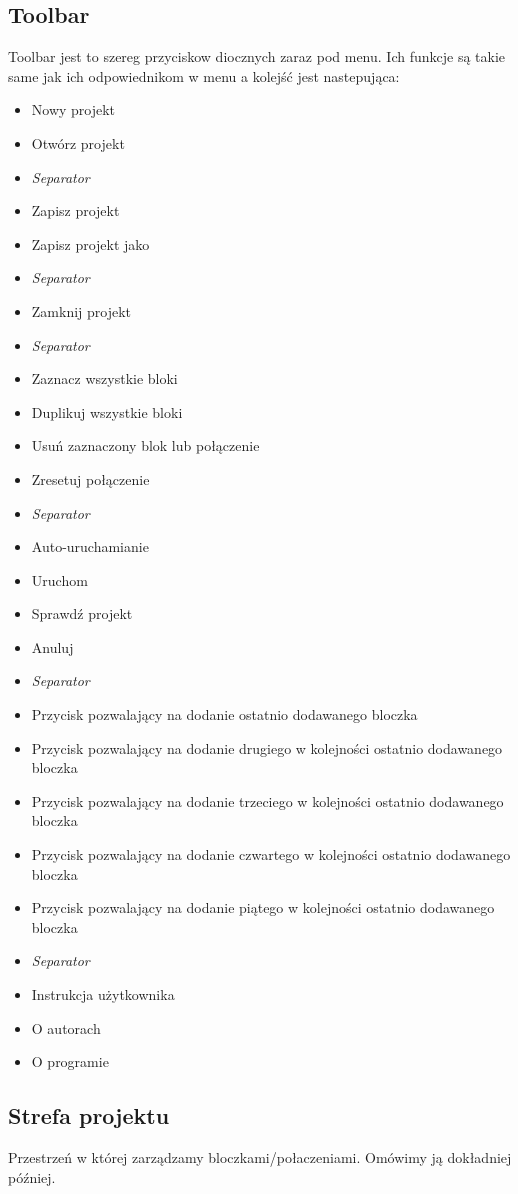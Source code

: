 \documentclass[a4paper,10pt]{article}
\begin{document}
\subsection{Toolbar}
Toolbar jest to szereg przyciskow diocznych zaraz pod menu. Ich funkcje są takie same jak ich odpowiednikom w menu a kolejść jest nastepująca:
\begin{itemize}
 \item Nowy projekt
 \item Otwórz projekt
 \item \textit{Separator}
 \item Zapisz projekt
 \item Zapisz projekt jako
 \item \textit{Separator}
 \item Zamknij projekt
 \item \textit{Separator}
 \item Zaznacz wszystkie bloki
 \item Duplikuj wszystkie bloki
 \item Usuń zaznaczony blok lub połączenie
 \item Zresetuj połączenie
 \item \textit{Separator}
 \item Auto-uruchamianie
 \item Uruchom
 \item Sprawdź projekt
 \item Anuluj
 \item \textit{Separator}
 \item Przycisk pozwalający na dodanie ostatnio dodawanego bloczka
 \item Przycisk pozwalający na dodanie drugiego w kolejności ostatnio dodawanego bloczka
 \item Przycisk pozwalający na dodanie trzeciego w kolejności ostatnio dodawanego bloczka
 \item Przycisk pozwalający na dodanie czwartego w kolejności ostatnio dodawanego bloczka
 \item Przycisk pozwalający na dodanie piątego w kolejności ostatnio dodawanego bloczka
 \item \textit{Separator}
 \item Instrukcja użytkownika
 \item O autorach
 \item O programie
\end{itemize}

\subsection{Strefa projektu}
Przestrzeń w której zarządzamy bloczkami/połaczeniami. Omówimy ją dokładniej później.
\end{document}
